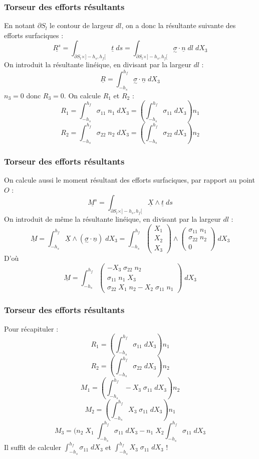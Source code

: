 \documentclass{beamer}
\begin{document}
\begin{frame}
    \frametitle{Torseur des efforts résultants}
    En notant $\partial S_l$ le contour de largeur $dl$, on a donc la résultante suivante des efforts surfaciques :
    $$\underline{R^{s}} = \int_{\partial S_l \times ]-h_s,h_f[}\underline{t}\;ds = \int_{\partial S_l \times ]-h_s,h_f[}\underset{\sim}{\sigma}\cdot\underline{n}\;dl\;dX_3$$
    On introduit la résultante linéique, en divisant par la largeur $dl$ :
    $$\underline{R} = \int_{-h_s}^{h_f}\underset{\sim}{\sigma}\cdot\underline{n}\;dX_3$$
    $n_3 = 0$ donc $R_3 = 0$. On calcule $R_1$ et $R_2$ :
    $$R_1 = \int_{-h_s}^{h_f}\sigma_{11}\;n_1\;dX_3 = (\int_{-h_s}^{h_f}\sigma_{11}\;dX_3)n_1$$
    $$R_2 = \int_{-h_s}^{h_f}\sigma_{22}\;n_2\;dX_3 = (\int_{-h_s}^{h_f}\sigma_{22}\;dX_3)n_2$$
\end{frame}

\begin{frame}
    \frametitle{Torseur des efforts résultants}
    On calcule aussi le moment résultant des efforts surfaciques, par rapport au point $O$ :
    $$\underline{M^{s}} = \int_{\partial S_l \times ]-h_s,h_f[}\underline{X}\wedge \underline{t}\;ds$$
    On introduit de même la résultante linéique, en divisant par la largeur $dl$ :
    $$\underline{M} = \int_{-h_s}^{h_f}\underline{X}\wedge (\underset{\sim}{\sigma}\cdot\underline{n})\;dX_3 = \int_{-h_s}^{h_f}\begin{pmatrix} X_1 \\ X_2 \\ X_3 \end{pmatrix}\wedge \begin{pmatrix} \sigma_{11}\;n_1 \\ \sigma_{22}\;n_2 \\ 0 \end{pmatrix}\;dX_3$$
    D'où $$\underline{M} = \int_{-h_s}^{h_f}\begin{pmatrix} -X_3\;\sigma_{22}\;n_2 \\ \sigma_{11}\;n_1\;X_3 \\ \sigma_{22}\;X_1\;n_2 - X_2\;\sigma_{11}\;n_1 \end{pmatrix}\;dX_3$$
\end{frame}

\begin{frame}
    \frametitle{Torseur des efforts résultants}
    Pour récapituler :
    $$R_1 = (\int_{-h_s}^{h_f}\sigma_{11}\;dX_3)n_1$$
    $$R_2 = (\int_{-h_s}^{h_f}\sigma_{22}\;dX_3)n_2$$
    $$M_1 = (\int_{-h_s}^{h_f} -X_3\;\sigma_{11}\;dX_3)n_2$$
    $$M_2 = (\int_{-h_s}^{h_f} X_3\;\sigma_{11}\;dX_3)n_1$$
    $$M_3 = (n_2\;X_1\;\int_{-h_s}^{h_f} \sigma_{11}\;dX_3 - n_1\;X_2 \int_{-h_s}^{h_f} \sigma_{11}\;dX_3$$
    Il suffit de calculer $\int_{-h_s}^{h_f}\sigma_{11}\;dX_3$ et $\int_{-h_s}^{h_f}X_3\;\sigma_{11}\;dX_3$ !
\end{frame}
\end{document}
